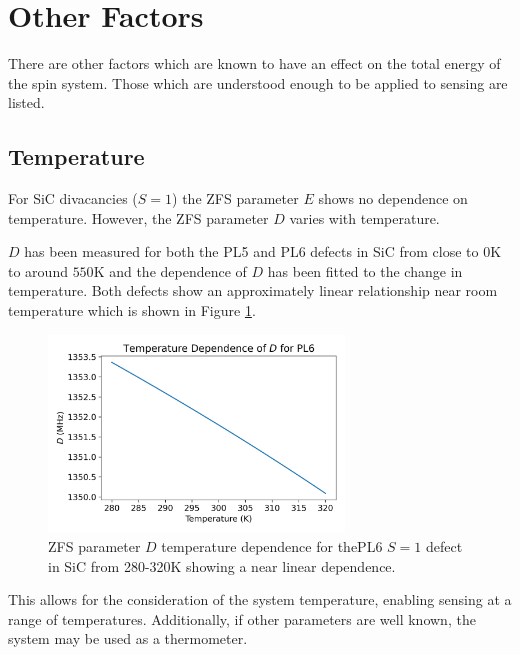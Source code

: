 \section{Other Factors}
There are other factors which are known to have an effect on the total energy of the spin system. Those which are understood enough to be applied to sensing are listed.
\subsection{Temperature}\label{D_vs_temp}
For SiC divacancies ($S=1$) the ZFS parameter $E$ shows no dependence on temperature. However, the ZFS parameter $D$ varies with temperature.

$D$ has been measured for both the PL5 and PL6 defects in SiC from close to $0$K to around $550$K and the dependence of $D$ has been fitted to the change in temperature.
Both defects show an approximately linear relationship near room temperature which is shown in Figure \ref{fig:PL5PL6DvsT}.



\begin{figure}[H]
	\begin{center}
		\includegraphics[width=0.7\textwidth]{figures/SiC-PL5PL6-D(T)-close.png}
		\caption{ZFS parameter $D$ temperature dependence for thePL6 $S=1$ defect in SiC from 280-320K showing a near linear dependence. }\label{fig:PL5PL6DvsT}
	\end{center}
\end{figure}


This allows for the consideration of the system temperature, enabling sensing at a range of temperatures. Additionally, if other parameters are well known, the system may be used as a thermometer.

